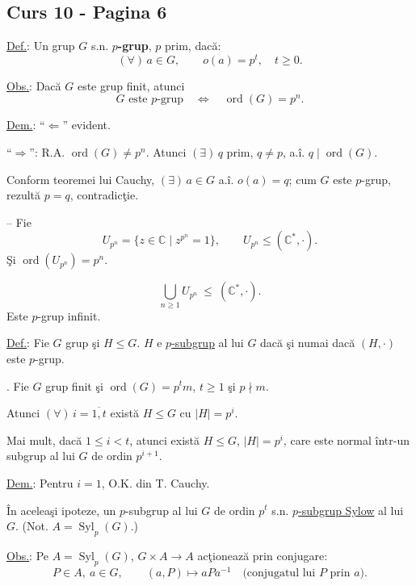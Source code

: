 
\subsection*{Curs 10 - Pagina 6}

\noindent\underline{Def.}: Un grup $G$ s.n. \textbf{$p$-grup}, $p$ prim, dacă:
\[
(\forall)\,a\in G,\qquad o(a)=p^t,\quad t\geq 0.
\]

\medskip
\noindent\underline{Obs.}: Dacă $G$ este grup finit, atunci
\[
\boxed{G\text{ este }p\text{-grup}\quad\Longleftrightarrow\quad
\operatorname{ord}(G)=p^n}.
\]

\noindent\underline{Dem.}: ``$\Leftarrow$'' evident.

\noindent ``$\Rightarrow$'': R.A. $\operatorname{ord}(G)\neq p^n$.
Atunci $(\exists)\,q$ prim, $q\neq p$, a.î. $q\mid\operatorname{ord}(G)$.

\noindent Conform teoremei lui Cauchy,
$(\exists)\,a\in G$ a.î. $o(a)=q$; cum $G$ este $p$-grup,
rezultă $p=q$, contradicţie.

\bigskip
\noindent-- Fie
\[
U_{p^n}=\{z\in\mathbb{C}\mid z^{p^n}=1\},
\qquad U_{p^n}\leq(\mathbb{C}^{*},\cdot).
\]
\noindent Şi $\operatorname{ord}(U_{p^n})=p^n$.

\[
\bigcup_{n\geq 1}U_{p^n}\ \leq\ (\mathbb{C}^{*},\cdot).
\]
\noindent Este $p$-grup infinit.

\bigskip
\noindent\underline{Def.}: Fie $G$ grup şi $H\leq G$.
$H$ e \underline{$p$-subgrup} al lui $G$ dacă şi numai dacă
$(H,\cdot)$ este $p$-grup.

\bigskip
\noindent{}.
Fie $G$ grup finit şi $\operatorname{ord}(G)=p^t m$,
$t\geq 1$ şi $p\nmid m$.

\medskip
\noindent Atunci $(\forall)\,i=\overline{1,t}$ există $H\leq G$
cu $|H|=p^i$.

\medskip
\noindent Mai mult, dacă $1\leq i<t$, atunci există $H\leq G$,
$|H|=p^i$, care este normal într-un subgrup al lui $G$
de ordin $p^{i+1}$.

\bigskip
\noindent\underline{Dem.}: Pentru $i=1$, O.K. din T. Cauchy.

\medskip
\noindent În aceleaşi ipoteze, un $p$-subgrup al lui $G$
de ordin $p^t$ s.n. \underline{$p$-subgrup Sylow} al lui $G$.
\quad (Not. $A=\operatorname{Syl}_p(G)$.)

\bigskip
\noindent\underline{Obs.}: Pe $A=\operatorname{Syl}_p(G)$,
$G\times A\longrightarrow A$ acţionează prin conjugare:
\[
P\in A,\ a\in G,\qquad
(a,P)\longmapsto aPa^{-1}
\quad\text{(conjugatul lui $P$ prin $a$)}.
\]

